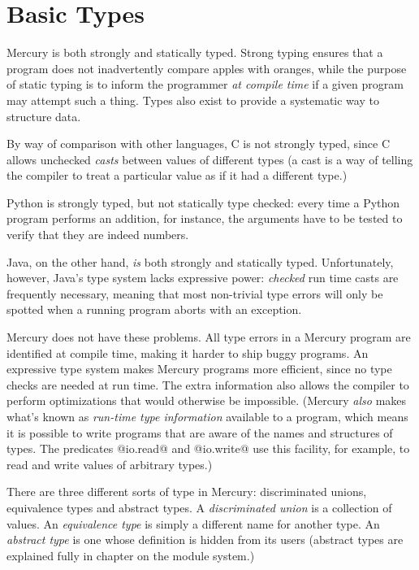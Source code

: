 
\chapter{Basic Types}


Mercury is both strongly and statically typed.  Strong typing ensures
that a program does not inadvertently compare apples with oranges, while
the purpose of static typing is to inform the programmer \emph{at
compile time} if a given program may attempt such a thing.  Types also
exist to provide a systematic way to structure data.

By way of comparison with other languages, C is not
strongly typed, since C allows unchecked \emph{casts} between values of
different types (a cast is a way of telling the compiler to
treat a particular value as if it had a different type.)

Python is strongly typed, but not statically type checked: every time a
Python program performs an addition, for instance, the arguments have to
be tested to verify that they are indeed numbers.

Java, on the other hand, \emph{is} both strongly and statically typed.
Unfortunately, however, Java's type system lacks expressive power:
\emph{checked} run time casts are frequently necessary, meaning that most
non-trivial type errors will only be spotted when a running program aborts
with an exception.

Mercury does not have these problems.  All type errors in
a Mercury program are identified at compile time, making it harder to
ship buggy programs.  An expressive type system makes Mercury programs more
efficient, since no type checks are needed at run time.  The extra
information also allows the compiler to perform optimizations that would
otherwise be impossible.  (Mercury \emph{also} makes what's known as
\emph{run-time type information} available to a program, which means it is
possible to write programs that are aware of the names and structures of
types.  The predicates @io.read@ and @io.write@ use this facility, for
example, to read and write values of arbitrary types.)

There are three different sorts of type in Mercury: discriminated
unions, equivalence types and abstract types.  A \emph{discriminated
union} is a collection of values.  An
\emph{equivalence type} is simply a different name for another type.  An
\emph{abstract type} is one whose definition is hidden from its users
(abstract types are explained fully in chapter \XXX{} on the module system.)

